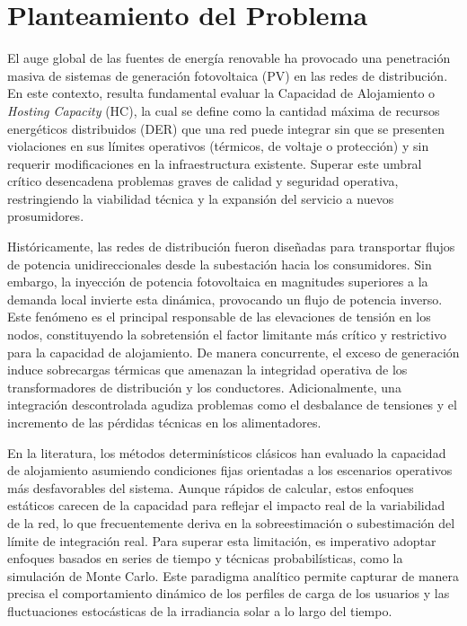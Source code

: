 
\section{Planteamiento del Problema}

El auge global de las fuentes de energía renovable ha provocado una penetración masiva de sistemas de generación fotovoltaica (PV) en las redes de distribución. En este contexto, resulta fundamental evaluar la Capacidad de Alojamiento o \textit{Hosting Capacity} (HC), la cual se define como la cantidad máxima de recursos energéticos distribuidos (DER) que una red puede integrar sin que se presenten violaciones en sus límites operativos (térmicos, de voltaje o protección) y sin requerir modificaciones en la infraestructura existente. Superar este umbral crítico desencadena problemas graves de calidad y seguridad operativa, restringiendo la viabilidad técnica y la expansión del servicio a nuevos prosumidores.

Históricamente, las redes de distribución fueron diseñadas para transportar flujos de potencia unidireccionales desde la subestación hacia los consumidores. Sin embargo, la inyección de potencia fotovoltaica en magnitudes superiores a la demanda local invierte esta dinámica, provocando un flujo de potencia inverso. Este fenómeno es el principal responsable de las elevaciones de tensión en los nodos, constituyendo la sobretensión el factor limitante más crítico y restrictivo para la capacidad de alojamiento. De manera concurrente, el exceso de generación induce sobrecargas térmicas que amenazan la integridad operativa de los transformadores de distribución y los conductores. Adicionalmente, una integración descontrolada agudiza problemas como el desbalance de tensiones y el incremento de las pérdidas técnicas en los alimentadores.

En la literatura, los métodos determinísticos clásicos han evaluado la capacidad de alojamiento asumiendo condiciones fijas orientadas a los escenarios operativos más desfavorables del sistema. Aunque rápidos de calcular, estos enfoques estáticos carecen de la capacidad para reflejar el impacto real de la variabilidad de la red, lo que frecuentemente deriva en la sobreestimación o subestimación del límite de integración real. Para superar esta limitación, es imperativo adoptar enfoques basados en series de tiempo y técnicas probabilísticas, como la simulación de Monte Carlo. Este paradigma analítico permite capturar de manera precisa el comportamiento dinámico de los perfiles de carga de los usuarios y las fluctuaciones estocásticas de la irradiancia solar a lo largo del tiempo.

